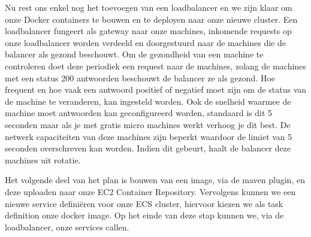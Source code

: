 \documentclass{article}
\begin{document}
	\par
	Nu rest ons enkel nog het toevoegen van een loadbalancer en we zijn klaar om onze Docker containers te bouwen en te deployen naar onze nieuwe cluster. Een loadbalancer fungeert als gateway naar onze machines, inkomende requests op onze loadbalancer worden verdeeld en doorgestuurd naar de machines die de balancer als gezond beschouwt. Om de gezondheid van een machine te controleren doet deze periodiek een request naar de machines, zolang de machines met een status 200 antwoorden beschouwt de balancer ze als gezond. Hoe frequent en hoe vaak een antwoord positief of negatief moet zijn om de status van de machine te veranderen, kan ingesteld worden. Ook de snelheid waarmee de machine moet antwoorden kan geconfigureerd worden, standaard is dit 5 seconden maar als je met gratis micro machines werkt verhoog je dit best. De netwerk capaciteiten van deze machines zijn beperkt waardoor de limiet van 5 seconden overschreven kan worden. Indien dit gebeurt, haalt de balancer deze machines uit rotatie.
	\par
	Het volgende deel van het plan is bouwen van een image, via de maven plugin, en deze uploaden naar onze EC2 Container Repository. Vervolgens kunnen we een nieuwe service defini\"eren voor onze ECS cluster, hiervoor kiezen we als task definition onze docker image. Op het einde van deze stap kunnen we, via de loadbalancer, onze services callen.
\end{document}
